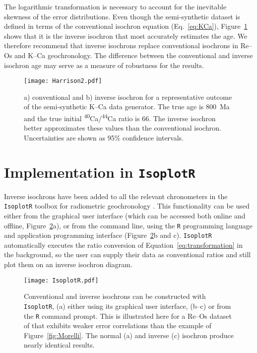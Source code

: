 \documentclass[]{article}
\begin{document}
The logarithmic transformation is necessary to account for the
inevitable skewness of the error distributions. Even though the
semi-synthetic dataset is defined in terms of the conventional
isochron equation (Eq.~\ref{eq:KCa}), Figure~\ref{fig:Harrison} shows
that it is the inverse isochron that most accurately estimates the
age. We therefore recommend that inverse isochrons replace
conventional isochrons in Re--Os and K--Ca geochronology. The
difference between the conventional and inverse isochron age may serve
as a measure of robustness for the results.

\begin{figure}
  \texttt{[image: Harrison2.pdf]}
  \caption{a) conventional and b) inverse isochron for a
    representative outcome of the semi-synthetic K--Ca data
    generator. The true age is 800~Ma and the true initial
    \textsuperscript{40}Ca/\textsuperscript{44}Ca ratio is 66. The
    inverse isochron better approximates these values than the
    conventional isochron. Uncertainties are shown as 95\% confidence
    intervals.}
  \label{fig:Harrison}
\end{figure}

\section{Implementation in \texttt{IsoplotR}}

Inverse isochrons have been added to all the relevant chronometers in
the \texttt{IsoplotR} toolbox for radiometric geochronology
\citep{vermeesch2018c}. This functionality can be used either from the
graphical user interface (which can be accessed both online and
offline, Figure~\ref{fig:IsoplotR}a), or from the command line, using
the \texttt{R} programming language and application programming
interface (Figure~\ref{fig:IsoplotR}b and c). \texttt{IsoplotR}
automatically executes the ratio conversion of
Equation~\ref{eq:transformation} in the background, so the user can
supply their data as conventional ratios and still plot them on an
inverse isochron diagram.

\begin{figure}[!ht]
  \texttt{[image: IsoplotR.pdf]}
  \caption{Conventional and inverse isochrons can be constructed with
    \texttt{IsoplotR}, (a) either using its graphical user interface,
    (b--c) or from the \texttt{R} command prompt. This is illustrated
    here for a Re--Os dataset of \citet{kendall2006} that exhibits
    weaker error correlations than the example of
    Figure~\ref{fig:Morelli}. The normal (a) and inverse (c) isochron
    produce nearly identical results.}
  \label{fig:IsoplotR}
\end{figure}
\end{document}
